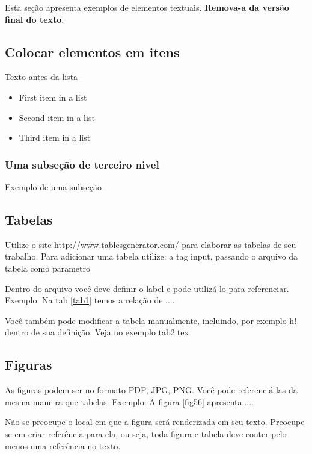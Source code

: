 \documentclass[	DIV=calc,%
paper=a4,%
fontsize=12pt,%
onecolumn]{scrartcl}	 					%
\begin{document}
	Esta seção apresenta exemplos de elementos textuais. \textbf{Remova-a da versão final do texto}.
	
	
	\subsection{Colocar elementos em itens}
	
	Texto antes da lista
	
	\begin{itemize}
		\item First item in a list 
		\item Second item in a list 
		\item Third item in a list
	\end{itemize}
	
	\subsubsection{Uma subseção de terceiro nivel}
	
	Exemplo de uma subseção
	
	\subsection{Tabelas}
	
	Utilize o site http://www.tablesgenerator.com/ para elaborar as tabelas de seu trabalho.
	Para adicionar uma tabela utilize: a tag input, passando o arquivo da tabela como parametro
	
	
	
	Dentro do arquivo você deve definir o label e pode utilizá-lo para referenciar. Exemplo:
	Na tab \ref{tab1} temos a relação de ....
	
	
	Você também pode modificar a tabela manualmente, incluindo, por exemplo h! dentro de sua definição. Veja no exemplo tab2.tex
	
	\subsection{Figuras}
	
	As figuras podem ser no formato PDF, JPG, PNG. Você pode referenciá-las da mesma maneira que tabelas. Exemplo: A figura \ref{fig56} apresenta.....
	
	Não se preocupe o local em que a figura será renderizada em seu texto. Preocupe-se em criar referência para ela, ou seja, toda figura e tabela deve conter pelo menos uma referência no texto.
	
\end{document}
